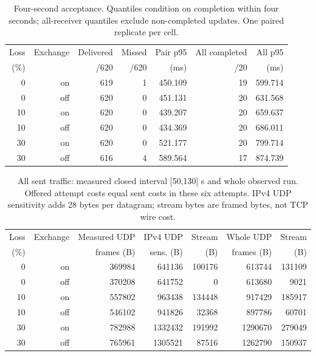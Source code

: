 \begin{table}[ht]\centering\small
\begin{tabular}{rr|rr|r|rr}
Loss & Exchange & Delivered & Missed & Pair p95 & All completed & All p95 \\
(\%) & & /620 & /620 & (ms) & /20 & (ms) \\ \hline
0 & on & 619 & 1 & 450.109 & 19 & 599.714 \\
0 & off & 620 & 0 & 451.131 & 20 & 631.568 \\
10 & on & 620 & 0 & 439.207 & 20 & 659.637 \\
10 & off & 620 & 0 & 434.369 & 20 & 686.011 \\
30 & on & 620 & 0 & 521.177 & 20 & 799.714 \\
30 & off & 616 & 4 & 589.564 & 17 & 874.739 \\
\end{tabular}
\caption{Four-second acceptance. Quantiles condition on completion within four seconds; all-receiver quantiles exclude non-completed updates. One paired replicate per cell.}\end{table}
\begin{table}[ht]\centering\small
\begin{tabular}{rr|rrr|rr}
Loss & Exchange & Measured UDP & IPv4 UDP & Stream & Whole UDP & Stream \\
(\%) & & frames (B) & sens. (B) & (B) & frames (B) & (B) \\ \hline
0 & on & 369984 & 641136 & 100176 & 613744 & 131109 \\
0 & off & 370208 & 641752 & 0 & 613680 & 9021 \\
10 & on & 557802 & 963438 & 134448 & 917429 & 185917 \\
10 & off & 546102 & 941826 & 32368 & 897786 & 60701 \\
30 & on & 782988 & 1332432 & 191992 & 1290670 & 279049 \\
30 & off & 765961 & 1305521 & 87516 & 1262790 & 150937 \\
\end{tabular}
\caption{All sent traffic: measured closed interval [50,130] s and whole observed run. Offered attempt costs equal sent costs in these six attempts. IPv4 UDP sensitivity adds 28 bytes per datagram; stream bytes are framed bytes, not TCP wire cost.}\end{table}
